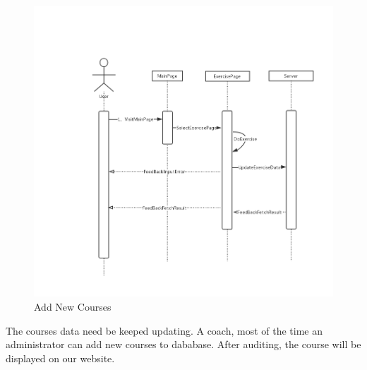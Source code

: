\documentclass[16pt]{scrreprt}
\begin{document}
\begin{figure}[H]
    \includegraphics[width=\linewidth]{./FuncPhoto/18.png}   
    \caption{Add New Courses}
\end{figure}
The courses data need be keeped updating. A coach, most of the time an administrator can add new courses to dababase. After auditing, the course will be displayed on our website. 
\end{document}
